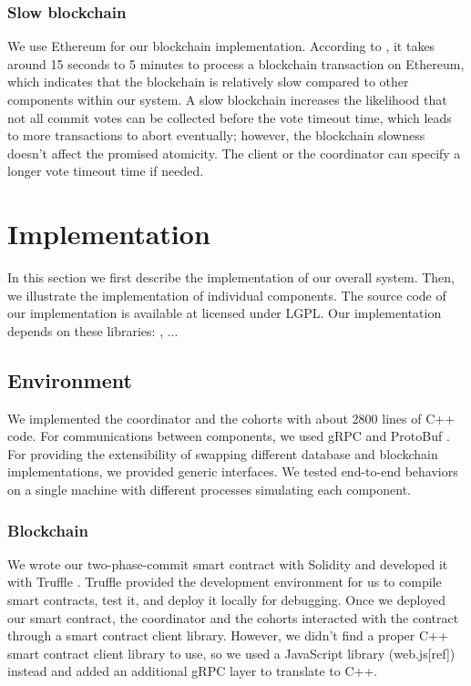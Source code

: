 \documentclass[11pt,conference]{IEEEtran}
\begin{document}
\subsubsection{Slow blockchain}
We use Ethereum for our blockchain implementation. According to \cite{}, it takes around 15 seconds to 5 minutes to process a blockchain transaction on Ethereum, which indicates that the blockchain is relatively slow compared to other components within our system. A slow blockchain increases the likelihood that not all commit votes can be collected before the vote timeout time, which leads to more transactions to abort eventually; however, the blockchain slowness doesn’t affect the promised atomicity. The client or the coordinator can specify a longer vote timeout time if needed.

\section{Implementation}
In this section we first describe the implementation of our overall system. Then, we illustrate the implementation of individual components. The source code of our implementation is available at \cite{} licensed under LGPL. Our implementation depends on these libraries: \cite{}, ...

\subsection{Environment}
We implemented the coordinator and the cohorts with about 2800 lines of C++ code. For communications between components, we used gRPC \cite{} and ProtoBuf \cite{}. For providing the extensibility of swapping different database and blockchain implementations, we provided generic interfaces. We tested end-to-end behaviors on a single machine with different processes simulating each component.

\subsubsection{Blockchain}
We wrote our two-phase-commit smart contract with Solidity and developed it with Truffle \cite{}. Truffle provided the development environment for us to compile smart contracts, test it, and deploy it locally for debugging. Once we deployed our smart contract, the coordinator and the cohorts interacted with the contract through a smart contract client library. However, we didn’t find a proper C++ smart contract client library to use, so we used a JavaScript library (web.js[ref]) instead and added an additional gRPC layer to translate to C++.
\end{document}
